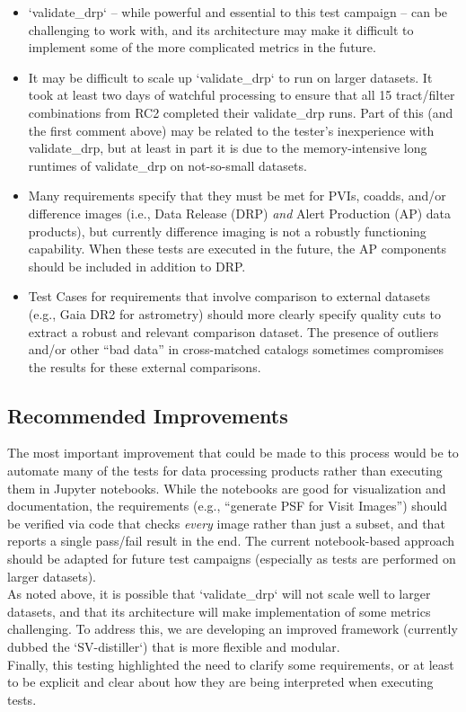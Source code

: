 \documentclass[DM,lsstdraft,STR,toc]{lsstdoc}
\providecommand{\tightlist}{
  \setlength{\itemsep}{0pt}\setlength{\parskip}{0pt}}
\begin{document}
\begin{itemize}
\tightlist
\item
  `validate\_drp` -- while powerful and essential to this test campaign
  -- can be challenging to work with, and its architecture may make it
  difficult to implement some of the more complicated metrics in the
  future.
\item
  It may be difficult to scale up `validate\_drp` to run on larger
  datasets. It took at least two days of watchful processing to ensure
  that all 15 tract/filter combinations from RC2 completed their
  validate\_drp runs. Part of this (and the first comment above) may be
  related to the tester's inexperience with validate\_drp, but at least
  in part it is due to the memory-intensive long runtimes of
  validate\_drp on not-so-small datasets.
\item
  Many requirements specify that they must be met for PVIs, coadds,
  and/or difference images (i.e., Data Release (DRP) \emph{and} Alert
  Production (AP) data products), but currently difference imaging is
  not a robustly functioning capability. When these tests are executed
  in the future, the AP components should be included in addition to
  DRP.
\item
  Test Cases for requirements that involve comparison to external
  datasets (e.g., Gaia DR2 for astrometry) should more clearly specify
  quality cuts to extract a robust and relevant comparison dataset. The
  presence of outliers and/or other ``bad data'' in cross-matched
  catalogs sometimes compromises the results for these external
  comparisons.
\end{itemize}


\subsection{Recommended Improvements}
\label{sect:recommendations}

 The most important improvement that could be made to this process would
be to automate many of the tests for data processing products rather
than executing them in Jupyter notebooks. While the notebooks are good
for visualization and documentation, the requirements (e.g., ``generate
PSF for Visit Images'') should be verified via code that checks
\emph{every} image rather than just a subset, and that reports a single
pass/fail result in the end. The current notebook-based approach should
be adapted for future test campaigns (especially as tests are performed
on larger datasets).\\[2\baselineskip]As noted above, it is possible
that `validate\_drp` will not scale well to larger datasets, and that
its architecture will make implementation of some metrics challenging.
To address this, we are developing an improved framework (currently
dubbed the `SV-distiller`) that is more flexible and
modular.\\[2\baselineskip]Finally, this testing highlighted the need to
clarify some requirements, or at least to be explicit and clear about
how they are being interpreted when executing tests.
\end{document}
